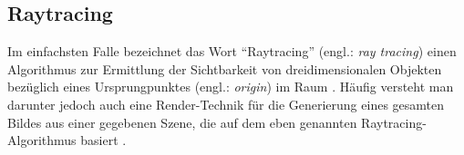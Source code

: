 


	\subsection{Raytracing} %
	\label{sub:raytracing}

		Im einfachsten Falle bezeichnet das Wort \enquote{Raytracing} (engl.: \textit{ray tracing}) einen Algorithmus zur Ermittlung der Sichtbarkeit von dreidimensionalen Objekten bezüglich eines Ursprungpunktes (engl.: \textit{origin}) im Raum \cite{pbrt3,parker-ray-tracing}.
		Häufig versteht man darunter jedoch auch eine Render-Technik für die Generierung eines gesamten Bildes aus einer gegebenen Szene, die auf dem eben genannten Raytracing-Algorithmus basiert \cite{pbrt3, nikodym-ray-tracing, parker-ray-tracing}.

